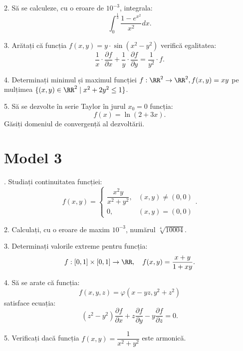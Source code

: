 \vspace{1cm}

2. Să se calculeze, cu o eroare de $ 10^{-3} $, integrala:
\[
  \int_0^{\frac{1}{3}} \frac{1 - e^{x^2}}{x^2} dx.
\]

\vspace{1cm}

3. Arătați că funcția $ f(x, y) = y \cdot \sin(x^2 - y^2) $ verifică egalitatea:
\[
  \frac{1}{x} \cdot \frac{\partial f}{\partial x} + %
  \frac{1}{y} \cdot \frac{\partial f}{\partial y} = \frac{1}{y^2} \cdot f.
\]

\vspace{1cm}

4. Determinați minimul și maximul funcției $ f : \RR^2 \to \RR^2, f(x, y) = xy $
pe mulțimea $ \{ (x, y) \in \RR^2 \mid x^2 + 2y^2 \leq 1 \} $.

\vspace{1cm}

5. Să se dezvolte în serie Taylor în jurul $ x_0 = 0 $ funcția:
\[
  f(x) = \ln(2 + 3x).
\]
Găsiți domeniul de convergență al dezvoltării.


\section{Model 3}

\indent{}. Studiați continuitatea funcției:
\[
  f(x, y) = \begin{cases}
    \dfrac{x^2 y}{x^2 + y^2}, & (x, y) \neq (0, 0) \\
    0, & (x, y) = (0, 0)
  \end{cases}.
\]

\vspace{1cm}

2. Calculați, cu o eroare de maxim $ 10^{-3} $, numărul $ \sqrt[4]{10004} $.

\vspace{1cm}

3. Determinați valorile extreme pentru funcția:
\[
  f : [0, 1] \times [0, 1] \to \RR, \quad f(x, y) = \dfrac{x + y}{1 + xy}.
\]

\vspace{1cm}

4. Să se arate că funcția:
\[
  f(x, y, z) = \varphi(x - yz, y^2 + z^2)
\]
satisface ecuația:
\[
  (z^2 - y^2) \frac{\partial f}{\partial x} + z \frac{\partial f}{\partial y} - %
  y \frac{\partial f}{\partial z} = 0.
\]

\vspace{1cm}

5. Verificați dacă funcția $ f(x, y) = \dfrac{1}{x^2 + y^2} $ este armonică.

